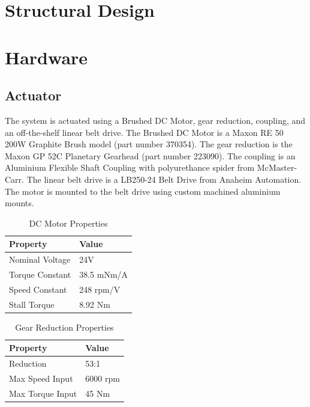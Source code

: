 \documentclass[12pt]{report}
\begin{document}
	\section{Structural Design}

	\section{Hardware}
		\subsection{Actuator}
		
	The system is actuated using a Brushed DC Motor, gear reduction, coupling, and an off-the-shelf linear belt drive. The Brushed DC Motor is a Maxon RE 50 200W Graphite Brush model (part number 370354). The gear reduction is the Maxon GP 52C Planetary Gearhead (part number 223090). The coupling is an Aluminium Flexible Shaft Coupling with polyurethance spider from McMaster-Carr. The linear belt drive is a LB250-24 Belt Drive from Anaheim Automation. The motor is mounted to the belt drive using custom machined aluminium mounts. 
	
	\begin{table}[]
	\centering
	\caption{DC Motor Properties}	
	\begin{tabular}{|l|l|}
		\hline
		\textbf{Property} & \textbf{Value}  \\ \hline
 		Nominal Voltage & 24V  \\ \hline
 		Torque Constant & 38.5 mNm/A \\ \hline
 		Speed Constant & 248 rpm/V  \\ \hline
 		Stall Torque & 8.92 Nm \\ \hline
		\end{tabular}
	\label{tab:motor}
	\end{table}
	
	\begin{table}[]
	\centering
	\caption{Gear Reduction Properties}	
	\begin{tabular}{|l|l|}
		\hline
		\textbf{Property} & \textbf{Value}  \\ \hline
 		Reduction & 53:1  \\ \hline
 		Max Speed Input & 6000 rpm  \\ \hline
 		Max Torque Input & 45 Nm  \\ \hline
		\end{tabular}
	\label{tab:gear}
	\end{table}
	
\end{document}
